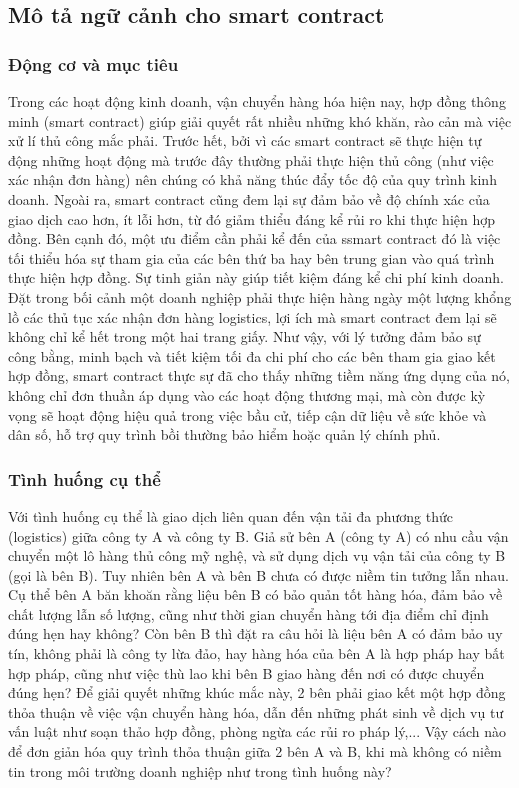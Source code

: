 \subsection{Mô tả ngữ cảnh cho smart contract}
\subsubsection{Động cơ và mục tiêu}
Trong các hoạt động kinh doanh, vận chuyển hàng hóa hiện nay, hợp đồng thông minh (smart contract) giúp giải quyết rất nhiều những khó khăn, rào cản mà việc xử lí thủ công mắc phải. Trước hết, bởi vì các smart contract sẽ thực hiện tự động những hoạt động mà trước đây thường phải thực hiện thủ công (như việc xác nhận đơn hàng) nên chúng có khả năng thúc đẩy tốc độ của quy trình kinh doanh. Ngoài ra, smart contract cũng đem lại sự đảm bảo về độ chính xác của giao dịch cao hơn, ít lỗi hơn, từ đó giảm thiểu đáng kể rủi ro khi thực hiện hợp đồng. Bên cạnh đó, một ưu điểm cần phải kể đến của ssmart contract đó là việc tối thiểu hóa sự tham gia của các bên thứ ba hay bên trung gian vào quá trình thực hiện hợp đồng. Sự tinh giản này giúp tiết kiệm đáng kể chi phí kinh doanh. Đặt trong bối cảnh một doanh nghiệp phải thực hiện hàng ngày một lượng khổng lồ các thủ tục xác nhận đơn hàng logistics, lợi ích mà smart contract đem lại sẽ không chỉ kể hết trong một hai trang giấy. Như vậy, với lý tưởng đảm bảo sự công bằng, minh bạch và tiết kiệm tối đa chi phí cho các bên tham gia giao kết hợp đồng, smart contract thực sự đã cho thấy những tiềm năng ứng dụng của nó, không chỉ đơn thuần áp dụng vào các hoạt động thương mại, mà còn được kỳ vọng sẽ hoạt động hiệu quả trong việc bầu cử, tiếp cận dữ liệu về sức khỏe và dân số, hỗ trợ quy trình bồi thường bảo hiểm hoặc quản lý chính phủ.

\subsubsection{Tình huống cụ thể}
Với tình huống cụ thể là giao dịch liên quan đến vận tải đa phương thức (logistics) giữa công ty A và công ty B. Giả sử bên A (công ty A) có nhu cầu vận chuyển một lô hàng thủ công mỹ nghệ, và sử dụng dịch vụ vận tải của công ty B (gọi là bên B). Tuy nhiên bên A và bên B chưa có được niềm tin tưởng lẫn nhau. Cụ thể bên A băn khoăn rằng liệu bên B có bảo quản tốt hàng hóa, đảm bảo về chất lượng lẫn số lượng, cũng như thời gian chuyển hàng tới địa điểm chỉ định đúng hẹn hay không? Còn bên B thì đặt ra câu hỏi là liệu bên A có đảm bảo uy tín, không phải là công ty lừa đảo, hay hàng hóa của bên A là hợp pháp hay bất hợp pháp, cũng như việc thù lao khi bên B giao hàng đến nơi có được chuyển đúng hẹn? Để giải quyết những khúc mắc này, 2 bên phải giao kết một hợp đồng thỏa thuận về việc vận chuyển hàng hóa, dẫn đến những phát sinh về dịch vụ tư vấn luật như soạn thảo hợp đồng, phòng ngừa các rủi ro pháp lý,... Vậy cách nào để đơn giản hóa quy trình thỏa thuận giữa 2 bên A và B, khi mà không có niềm tin trong môi trường doanh nghiệp như trong tình huống này?



